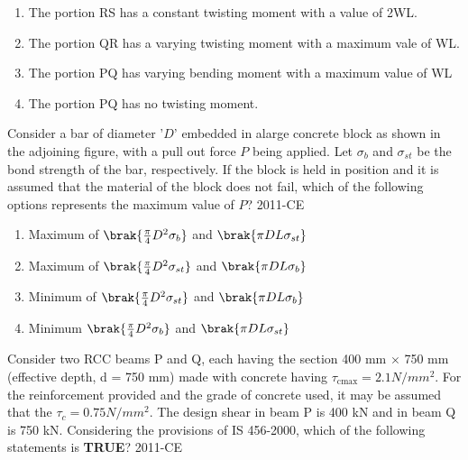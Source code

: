 \begin{figure}[h!]
\centering

\end{figure}
	\begin{enumerate}
		\item The portion RS has a constant twisting moment with a value of 2WL.
		\item The portion QR has a varying twisting moment with a maximum vale of WL.
		\item The portion PQ has varying bending moment with a maximum value of WL
		\item The portion PQ has no twisting moment.
	\end{enumerate}

\newpage
\item Consider a bar of diameter '$D$' embedded in alarge concrete block as shown in the adjoining figure, with a pull out force $P$ being applied. Let $\sigma_b$ and $\sigma_{st}$ be the bond strength of the bar, respectively. If the block is held in position and it is assumed that the material of the block does not fail, which of the following options represents the maximum value of $P$?
	\hfill{2011-CE}

\begin{figure}[ht]
\centering

\end{figure}
	\begin{multicols}{2}
	\begin{enumerate}
		\item Maximum of $\brak{\frac{\pi}{4}D^{2}\sigma_{b}}$ and $\brak{\pi DL\sigma_{st}}$
		\item Maximum of $\brak{\frac{\pi}{4}D^{2}\sigma_{st}}$ and $\brak{\pi DL\sigma_{b}}$
		\item Minimum of $\brak{\frac{\pi}{4}D^{2}\sigma_{st}}$ and $\brak{\pi DL\sigma_{b}}$
		\item Minimum $\brak{\frac{\pi}{4}D^{2}\sigma_{b}}$ and $\brak{\pi DL\sigma_{st}}$
	\end{enumerate}
	\end{multicols}

\item Consider two RCC beams P and Q, each having the section 400 mm $\times$ 750 mm (effective depth, d = 750 mm) made with concrete having $\tau_{\text{cmax}} = 2.1 N/mm^{2}$. For the reinforcement provided and the grade of concrete used, it may be assumed that the $\tau_c = 0.75 N/mm^{2}$. The design shear in beam P is 400 kN and in beam Q is 750 kN. Considering the provisions of IS 456-2000, which of the following statements is \textbf{TRUE}?
	\hfill{2011-CE}

